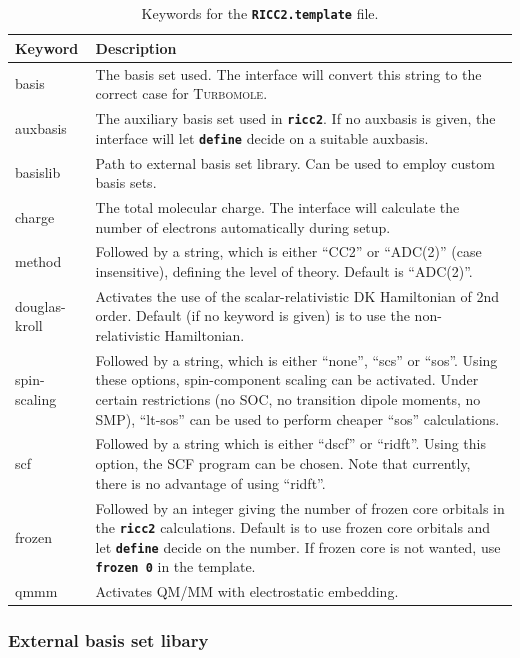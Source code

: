 \documentclass[a4paper,10pt,DIV=15,openany]{scrbook}
\newcommand{\ttt}[1]{\textbf{\texttt{#1}}}
\begin{document}
\begin{table}
  \centering
  \caption{Keywords for the \ttt{RICC2.template} file.}
  \label{tab:ricc2_temp}
  \begin{tabular}{>{\ttfamily}lp{12cm}}
  \hline
  Keyword       &Description\\
  \hline
basis           &The basis set used. The interface will convert this string to the correct case for \textsc{Turbomole}.\\
auxbasis        &The auxiliary basis set used in \ttt{ricc2}. If no auxbasis is given, the interface will let \ttt{define} decide on a suitable auxbasis.\\
basislib        &Path to external basis set library. Can be used to employ custom basis sets.\\
charge          &The total molecular charge. The interface will calculate the number of electrons automatically during setup.\\
method          &Followed by a string, which is either ``CC2'' or ``ADC(2)'' (case insensitive), defining the level of theory. Default is ``ADC(2)''.\\
douglas-kroll   &Activates the use of the scalar-relativistic DK Hamiltonian of 2nd order. Default (if no keyword is given) is to use the non-relativistic Hamiltonian.\\
spin-scaling    &Followed by a string, which is either ``none'', ``scs'' or ``sos''. Using these options, spin-component scaling can be activated. Under certain restrictions (no SOC, no transition dipole moments, no SMP), ``lt-sos'' can be used to perform cheaper ``sos'' calculations.\\
scf             &Followed by a string which is either ``dscf'' or ``ridft''. Using this option, the SCF program can be chosen. Note that currently, there is no advantage of using ``ridft''.\\
frozen          &Followed by an integer giving the number of frozen core orbitals in the \ttt{ricc2} calculations. Default is to use frozen core orbitals and let \ttt{define} decide on the number. If frozen core is not wanted, use \ttt{frozen 0} in the template.\\
qmmm            &Activates QM/MM with electrostatic embedding.\\
  \hline
  \end{tabular}
\end{table}

\subsubsection{External basis set libary}
\end{document}
